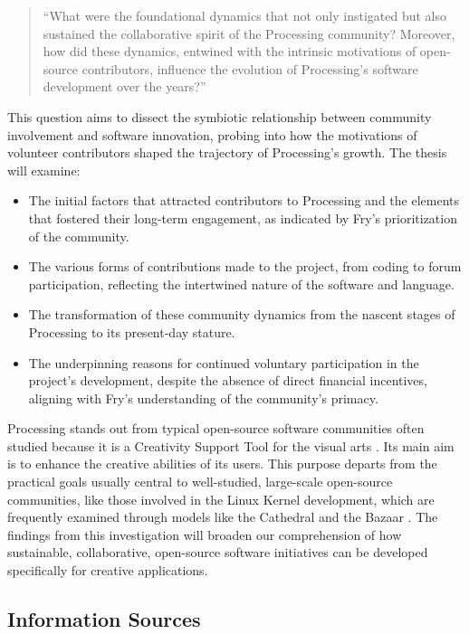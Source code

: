 \begin{quote}
  \enquote{What were the foundational dynamics that not only instigated but also sustained the collaborative spirit of the Processing community? Moreover, how did these dynamics, entwined with the intrinsic motivations of open-source contributors, influence the evolution of Processing's software development over the years?}
\end{quote}

This question aims to dissect the symbiotic relationship between community involvement and software innovation, probing into how the motivations of volunteer contributors shaped the trajectory of Processing's growth. The thesis will examine:

\begin{itemize}
\item The initial factors that attracted contributors to Processing and the elements that fostered their long-term engagement, as indicated by Fry's prioritization of the community.
\item The various forms of contributions made to the project, from coding to forum participation, reflecting the intertwined nature of the software and language.
\item The transformation of these community dynamics from the nascent stages of Processing to its present-day stature.
\item The underpinning reasons for continued voluntary participation in the project's development, despite the absence of direct financial incentives, aligning with Fry's understanding of the community's primacy.
\end{itemize}

Processing stands out from typical open-source software communities often studied because it is a Creativity Support Tool for the visual arts \parencite{shneidermanCreativitySupportTools2002}. Its main aim is to enhance the creative abilities of its users. This purpose departs from the practical goals usually central to well-studied, large-scale open-source communities, like those involved in the Linux Kernel development, which are frequently examined through models like the Cathedral and the Bazaar \parencite{raymondCathedralBazaarMusings2002}.
The findings from this investigation will broaden our comprehension of how sustainable, collaborative, open-source software initiatives can be developed specifically for creative applications.

\subsection{Information Sources}

